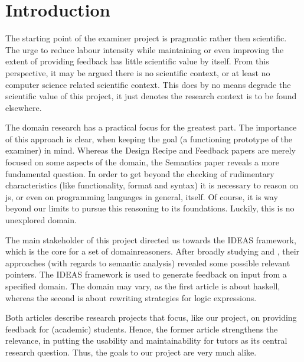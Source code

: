 
\section{Introduction}

The starting point of the 
\gls{examiner} project is pragmatic rather then scientific. 
The urge to reduce labour intensity while maintaining or even improving the 
extent of providing \gls{feedback} has little scientific value by itself. From 
this perspective, it may be argued there is no scientific context, or at least 
no computer science related scientific context. This does by no means degrade 
the scientific value of this project, it just denotes the research context is 
to be found elsewhere. 


The domain research has a practical focus for the greatest part. The 
importance of this approach is clear, when keeping the goal (a functioning 
prototype of the \gls{examiner}) in mind. Whereas the Design Recipe and 
Feedback papers are merely focused on some aspects of the domain, the 
Semantics paper reveals a more fundamental question. In order to get beyond 
the checking of rudimentary characteristics (like functionality, format and 
syntax) it is necessary to reason on \gls{js}, or even on programming 
languages in general, itself. Of course, it is way beyond our limits to pursue 
this reasoning to its foundations. Luckily, this is no unexplored domain.


The main stakeholder of this project directed us towards the IDEAS framework, 
which is the core for a set of \glspl{domainreasoner}. After broadly studying 
\citep{gerdes2012ask} and \citep{heeren2010specifying}, their approaches (with 
regards to semantic analysis) revealed some possible relevant pointers. The 
IDEAS framework is used to generate feedback on input from a specified domain. 
The domain may vary, as the first article is about \gls{haskell}, whereas the 
second is about rewriting strategies for logic expressions.


Both articles describe research projects that focus, like our project, on
providing feedback for (academic) students. Hence, the former article
strengthens the relevance, in putting the usability and maintainability for 
tutors as its central research question. Thus, the goals to our project are 
very much alike. 


